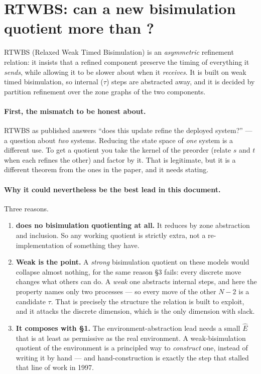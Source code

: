 \section{RTWBS: can a new bisimulation quotient more than \uppaal{}? \hfill \open{}}

RTWBS (Relaxed Weak Timed Bisimulation) is an \emph{asymmetric} refinement relation: it insists
that a refined component preserve the timing of everything it \emph{sends}, while allowing it to be
slower about when it \emph{receives}. It is built on weak timed bisimulation, so internal
($\tau$) steps are abstracted away, and it is decided by partition refinement over the zone graphs
of the two components.

\paragraph{First, the mismatch to be honest about.} RTWBS as published answers ``does this update
refine the deployed system?'' --- a question about \emph{two} systems. Reducing the state space of
\emph{one} system is a different use. To get a quotient you take the kernel of the preorder (relate
$s$ and $t$ when each refines the other) and factor by it. That is legitimate, but it is a
different theorem from the ones in the paper, and it needs stating.

\paragraph{Why it could nevertheless be the best lead in this document.} Three reasons.

\begin{enumerate}
\item \textbf{\uppaal{} does no bisimulation quotienting at all.} It reduces by zone abstraction and
      inclusion. So any working quotient is strictly extra, not a re-implementation of something
      they have.

\item \textbf{Weak is the point.} A \emph{strong} bisimulation quotient on these models would
      collapse almost nothing, for the same reason \S3 fails: every discrete move changes what
      others can do. A \emph{weak} one abstracts internal steps, and here the property names only
      two processes --- so every move of the other $N-2$ is a candidate $\tau$. That is precisely
      the structure the relation is built to exploit, and it attacks the discrete dimension, which
      is the only dimension with slack.

\item \textbf{It composes with \S1.} The environment-abstraction lead needs a small $\hat E$ that is
      at least as permissive as the real environment. A weak-bisimulation quotient of the
      environment is a principled way to \emph{construct} one, instead of writing it by hand ---
      and hand-construction is exactly the step that stalled that line of work in 1997.
\end{enumerate}

